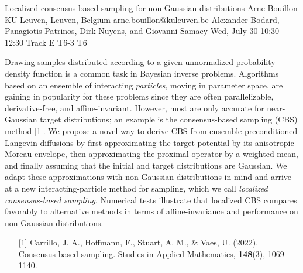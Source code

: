 \begin{talk}
  {Localized consensus-based sampling for non-Gaussian distributions}%
  {Arne Bouillon}%
  {KU Leuven, Leuven, Belgium}%
  {arne.bouillon@kuleuven.be}%
  {Alexander Bodard, Panagiotis Patrinos, Dirk Nuyens, and Giovanni Samaey}%
  {}%
  {Wed, July 30 10:30-12:30 Track E}%
  {T6-3}%
  {T6}%

  Drawing samples distributed according to a given unnormalized probability density function is a common task in Bayesian inverse problems. Algorithms based on an ensemble of interacting \emph{particles}, moving in parameter space, are gaining in popularity for these problems since they are often parallelizable, derivative-free, and affine-invariant. However, most are only accurate for near-Gaussian target distributions; an example is the consensus-based sampling (CBS) method [1]. We propose a novel way to derive CBS from ensemble-preconditioned Langevin diffusions by first approximating the target potential by its anisotropic Moreau envelope, then approximating the proximal operator by a weighted mean, and finally assuming that the initial and target distributions are Gaussian. We adapt these approximations with non-Gaussian distributions in mind and arrive at a new interacting-particle method for sampling, which we call \emph{localized consensus-based sampling}. Numerical tests illustrate that localized CBS compares favorably to alternative methods in terms of affine-invariance and performance on non-Gaussian distributions.
\medskip

\begin{enumerate}
  \item[{[1]}] Carrillo, J. A., Hoffmann, F., Stuart, A. M., \& Vaes, U. (2022). Consensus-based sampling. Studies in Applied Mathematics, \textbf{148}(3), 1069--1140.
\end{enumerate}
\end{talk}
